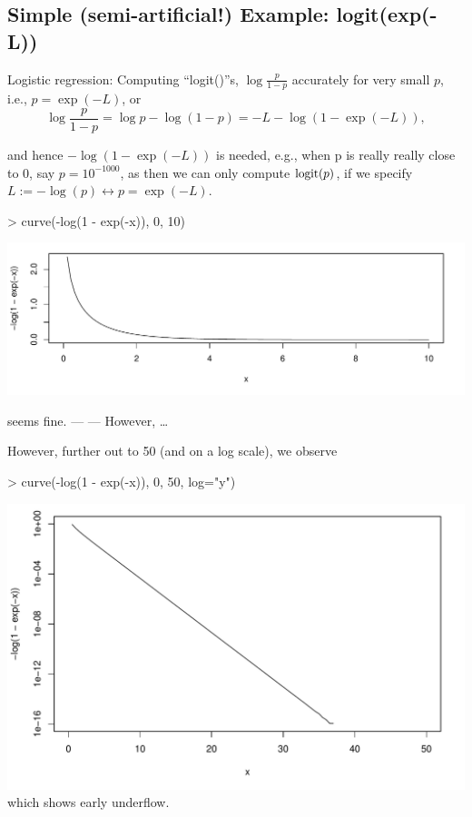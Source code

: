 


\subsection{Simple (semi-artificial!) Example: logit(exp(-L))}
\begin{frame}[fragile]
  Logistic regression: Computing ``logit()''s, $\log \frac{p}{1-p}$
  accurately for very small $p$, i.e., $p = \exp(-L)$, or
  \vspace*{-.6ex}
  \[
  \log\frac{p}{1-p} = \log p - \log(1 - p) = -L - \log(1 - \exp(-L)),
  \]
  \vspace*{-.5ex}

  and hence $-\log(1 - \exp(-L))$ is needed, e.g.,
  when p is really really close to 0, say $p = 10^{-1000}$, as then
  we can only compute $\operatorname{logit}(p)$, if we specify  $L := -\log(p) \leftrightarrow p = \exp(-L)$.

\begin{Schunk}
\begin{Sinput}
> curve(-log(1 - exp(-x)), 0, 10)
\end{Sinput}
\end{Schunk}
\includegraphics{log1exp-log1-exp-curve-10}

seems fine. --- ---  However, \dots
\end{frame}

\begin{frame}[fragile]
However, further out to 50 (and on a log scale), we observe

\begin{Schunk}
\begin{Sinput}
> curve(-log(1 - exp(-x)),  0, 50, log="y")
\end{Sinput}
\end{Schunk}
\includegraphics{log1exp-log1-exp-curve-log}
\\[-.6ex]
which shows early underflow.
\end{frame}

